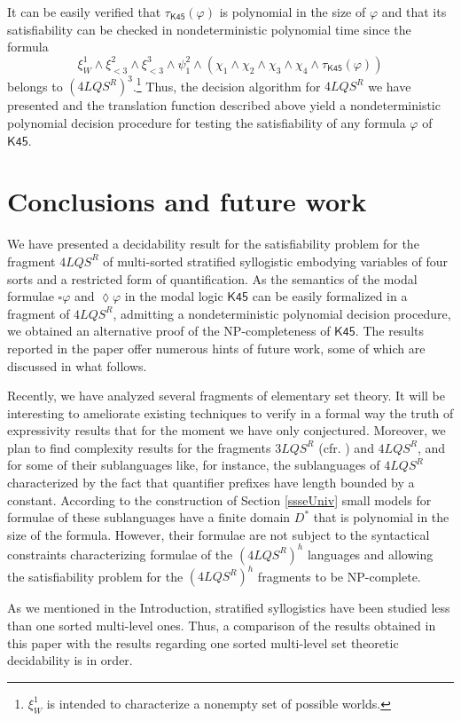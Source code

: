 \documentclass{fundam}
\renewcommand{\And}{\wedge}
\newcommand{\Kqc}{\mathsf{K45}}
\newcommand{\TKqc}{\tau_{\Kqc}}
\newcommand{\QLQSR}{\ensuremath{\mbox{$4\mathit{LQS}^{R}$}}\xspace}
\newcommand{\TLQSR}{\ensuremath{\mbox{$3\mathit{LQS}^{R}$}}\xspace}
\begin{document}
It can be easily verified that $\TKqc(\varphi)$ is polynomial in the
size of $\varphi$ and that its satisfiability can be checked in
nondeterministic polynomial time since the formula
$$
\xi_W^1 \And \xi_{< 3}^2 \And \xi_{< 3}^3 \And \psi_1^2 \And (\chi_1
\And \chi_2 \And \chi_3 \And \chi_4 \And \TKqc(\varphi))
$$
belongs to $(\QLQSR)^3$.\footnote{$\xi_W^1$ is intended to
characterize a nonempty set of possible worlds.} Thus, the decision
algorithm for $\QLQSR$ we have presented and the translation function
described above yield a nondeterministic polynomial decision procedure
for testing the satisfiability of any formula $\varphi$ of $\Kqc$.


\section{Conclusions and future work}
We have presented a decidability result for the satisfiability problem
for the fragment $\QLQSR$ of multi-sorted stratified syllogistic
embodying variables of four sorts and a restricted form of
quantification.  As the semantics of the modal formulae $\square
\varphi$ and $\lozenge \varphi$ in the modal logic $\Kqc$
can be easily formalized in a fragment of $\QLQSR$, admitting a
nondeterministic polynomial decision procedure, we obtained an
alternative proof of the \textsf{NP}-completeness of $\Kqc$. The results
reported in the paper offer numerous hints of future work, some of which are discussed in what follows.

 Recently, we have analyzed several fragments of elementary set theory. It
will be interesting to ameliorate existing techniques to verify in a formal way the truth
of expressivity results that for the moment we have only conjectured. Moreover, we plan to
find complexity results for the fragments $\TLQSR$ (cfr. \cite{CanNic08}) and $\QLQSR$, and for some of their sublanguages
like, for instance, the sublanguages of $\QLQSR$ characterized by the fact that quantifier prefixes have
length bounded by a constant. According to the construction of Section \ref{ssseUniv} small models for
formulae of these sublanguages have a finite domain $D^*$ that is polynomial in the size of the formula. However, their
formulae are not subject to the syntactical constraints characterizing formulae of the $(\QLQSR)^h$ languages and allowing
the satisfiability problem for the $(\QLQSR)^h$ fragments to be \textsf{NP}-complete.

As we mentioned in the Introduction, stratified syllogistics have been studied less than one sorted multi-level ones.
Thus, a comparison of the results obtained in this paper with the results regarding one sorted multi-level
set theoretic decidability is in order.
\end{document}
